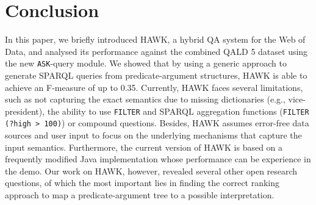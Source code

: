\section{Conclusion}
\label{chanliwod:sec:conclusion}
In this paper, we briefly introduced HAWK, a hybrid QA system for the Web of Data, and analysed its performance against the combined QALD 5 dataset using the new \texttt{ASK}-query module. 
We showed that by using a generic approach to generate SPARQL queries from predicate-argument structures, HAWK is able to achieve an F-measure of up to 0.35.
Currently, HAWK faces several limitations, such as not capturing the exact semantics due to missing dictionaries (e.g., vice-president), the ability to use \texttt{FILTER} and SPARQL aggregation functions (\texttt{FILTER (?high > 100)}) or compound questions. 
Besides, HAWK assumes error-free data sources and user input to focus on the underlying mechanisms that capture the input semantics.
Furthermore, the current version of HAWK is based on a frequently modified Java implementation whose performance can be experience in the demo. 
Our work on HAWK, however, revealed several other open research questions, of which the most important lies in finding the correct ranking approach to map a predicate-argument tree to a possible interpretation. 

%
%

%